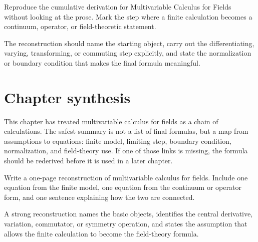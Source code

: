 \begin{exercise}
Reproduce the cumulative derivation for Multivariable Calculus for Fields without looking at the prose.  Mark the step where a finite calculation becomes a continuum, operator, or field-theoretic statement.
\begin{answer}
The reconstruction should name the starting object, carry out the differentiating, varying, transforming, or commuting step explicitly, and state the normalization or boundary condition that makes the final formula meaningful.
\end{answer}
\end{exercise}



\section{Chapter synthesis}

This chapter has treated multivariable calculus for fields as a chain of calculations.  The safest summary is not a list of final formulas, but a map from assumptions to equations: finite model, limiting step, boundary condition, normalization, and field-theory use.  If one of those links is missing, the formula should be rederived before it is used in a later chapter.

\begin{exercise}
Write a one-page reconstruction of multivariable calculus for fields.  Include one equation from the finite model, one equation from the continuum or operator form, and one sentence explaining how the two are connected.
\begin{answer}
A strong reconstruction names the basic objects, identifies the central derivative, variation, commutator, or symmetry operation, and states the assumption that allows the finite calculation to become the field-theory formula.
\end{answer}
\end{exercise}
